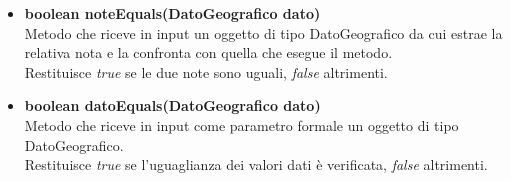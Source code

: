 \documentclass[a4paper, 12pt]{scrreprt}
\begin{document}
\begin{itemize}
				\item \textbf{boolean noteEquals(DatoGeografico dato)}
				\\Metodo che riceve in input un oggetto di tipo DatoGeografico da cui estrae la relativa nota e la confronta con quella che esegue il metodo.
				\\Restituisce \textit{true} se le due note sono uguali, \textit{false} altrimenti.
				
				\item \textbf{boolean datoEquals(DatoGeografico dato)}
				\\Metodo che riceve in input come parametro formale un oggetto di tipo DatoGeografico.
				\\Restituisce \textit{true} se l'uguaglianza dei valori dati \`e verificata, \textit{false} altrimenti.
			\end{itemize}
\end{document}
